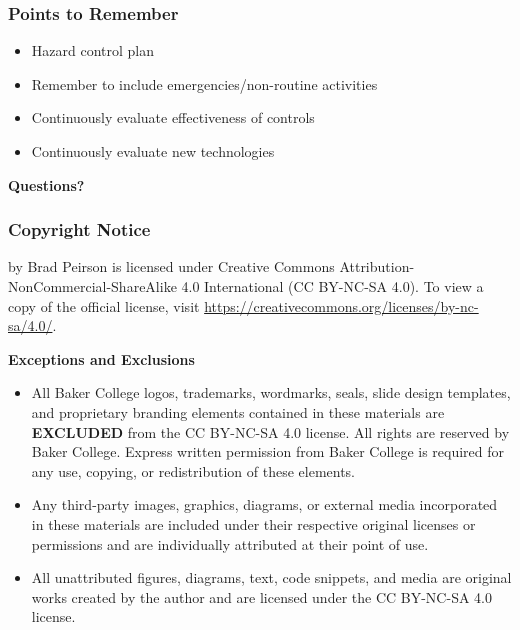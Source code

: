 \begin{frame}
    \frametitle{Points to Remember}
    \begin{itemize}
        \item Hazard control plan
        \item Remember to include emergencies/non-routine activities
        \item Continuously evaluate effectiveness of controls
        \item Continuously evaluate new technologies
    \end{itemize}
\end{frame}


\begin{frame}
    \centering
    {\Huge \textbf{\textcolor{BakerADARed}{Questions?}}}
\end{frame}

\begin{frame}
    \frametitle{Copyright Notice}
    
    {\footnotesize
    \PresTitle {} by Brad Peirson is licensed under Creative Commons Attribution-NonCommercial-ShareAlike 4.0 International (CC BY-NC-SA 4.0). To view a copy of the official license, visit \href{https://creativecommons.org/licenses/by-nc-sa/4.0/}{https://creativecommons.org/licenses/by-nc-sa/4.0/}.

    \vspace{0.5em}

    \textbf{Exceptions and Exclusions}

    \begin{itemize}
        \item[Baker College Branding \& Trademarks:]All Baker College logos, trademarks, wordmarks, seals, slide design templates, and proprietary branding elements contained in these materials are \textbf{EXCLUDED} from the CC BY-NC-SA 4.0 license. All rights are reserved by Baker College. Express written permission from Baker College is required for any use, copying, or redistribution of these elements.
        \item[Third-Party Media \& Content:] Any third-party images, graphics, diagrams, or external media incorporated in these materials are included under their respective original licenses or permissions and are individually attributed at their point of use. 
        \item[Original Author Content:] All unattributed figures, diagrams, text, code snippets, and media are original works created by the author and are licensed under the CC BY-NC-SA 4.0 license.
    \end{itemize}
    \par}
\end{frame}




